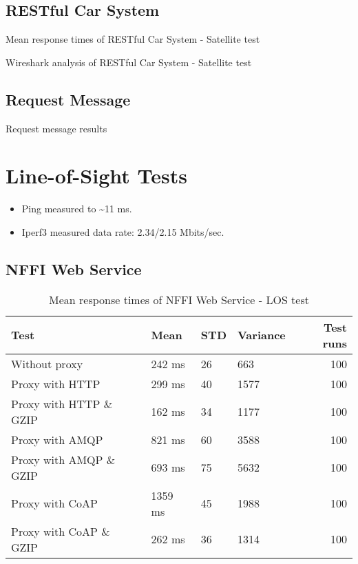 \begin{appendices}
\subsection{RESTful Car System}

\begin{table}[H]

\caption{Mean response times of RESTful Car System - Satellite test}
\end{table}

\begin{table}[H]

\caption{Wireshark analysis of RESTful Car System - Satellite test}
\end{table}

\subsection{Request Message}

\begin{table}[H]

\caption{Request message results}
\end{table}


\section{Line-of-Sight Tests}

\begin{itemize}
	\item Ping measured to \textasciitilde 11 ms.
	\item Iperf3 measured data rate: 2.34/2.15 Mbits/sec.
\end{itemize}

\subsection{NFFI Web Service}

\begin{table}[H]
\begin{tabular}{llllr}
\hline
 Test                   &   Mean &   STD &   Variance &   Test runs \\
\hline
  Without proxy & 242 ms & 26 & 663 & 100 \\
  Proxy with HTTP & 299 ms & 40 & 1577 & 100 \\
  Proxy with HTTP \& GZIP & 162 ms & 34 & 1177 & 100 \\
  Proxy with AMQP & 821 ms & 60 & 3588 & 100 \\
  Proxy with AMQP \& GZIP & 693 ms & 75 & 5632 & 100\\
  Proxy with CoAP & 1359 ms & 45 & 1988 & 100 \\
  Proxy with CoAP \& GZIP & 262 ms & 36 & 1314 & 100 \\
\end{tabular}
\caption{Mean response times of NFFI Web Service - LOS test}
\end{table}


\end{appendices}
